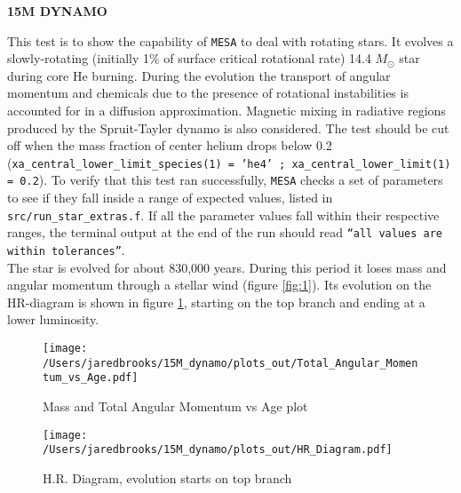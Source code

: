 \documentclass{article}
\begin{document}
	
	\begin{center}
		\begin{Large}
		       \textbf{15M DYNAMO}\\
		\end{Large}
	\end{center}

        This test is to show the capability of \texttt{MESA} to deal with rotating stars. It evolves a slowly-rotating (initially 1\% of surface critical rotational rate) 14.4 $M_\odot$ star during core He burning.  During the evolution the transport of angular momentum and chemicals due to the presence of rotational instabilities is accounted for in a diffusion approximation.  Magnetic mixing in radiative regions produced by the Spruit-Tayler dynamo is also considered.  The test should be cut off when the mass fraction of center helium drops below 0.2 (\texttt{xa\_central\_lower\_limit\_species(1) = 'he4' ; xa\_central\_lower\_limit(1) = 0.2}).  To verify that this test ran successfully, \texttt{MESA} checks a set of parameters to see if they fall inside a range of expected values, listed in \texttt{src/run\_star\_extras.f}.  If all the parameter values fall within their respective ranges, the terminal output at the end of the run should read \texttt{``all values are within tolerances''}.\\

        The star is evolved for about 830,000 years. During this period it loses mass and angular momentum through a stellar wind (figure \ref{fig:1}).  Its evolution on the HR-diagram is shown in figure \ref{fig:2}, starting on the top branch and ending at a lower luminosity.

	\begin{figure}[H]
                \begin{minipage}[b]{0.5\linewidth}
		       \centering
		       \texttt{[image: /Users/jaredbrooks/15M\_dynamo/plots\_out/Total\_Angular\_Momentum\_vs\_Age.pdf]}
		       \caption{Mass and Total Angular Momentum vs Age plot}
		       \label{fig:1}
                \end{minipage}
                \hspace{0cm}
                \begin{minipage}[b]{0.5\linewidth}
                       \centering
                       \texttt{[image: /Users/jaredbrooks/15M\_dynamo/plots\_out/HR\_Diagram.pdf]}
                       \caption{H.R. Diagram, evolution starts on top branch}
                       \label{fig:2}
                \end{minipage}
	\end{figure}
\end{document}
